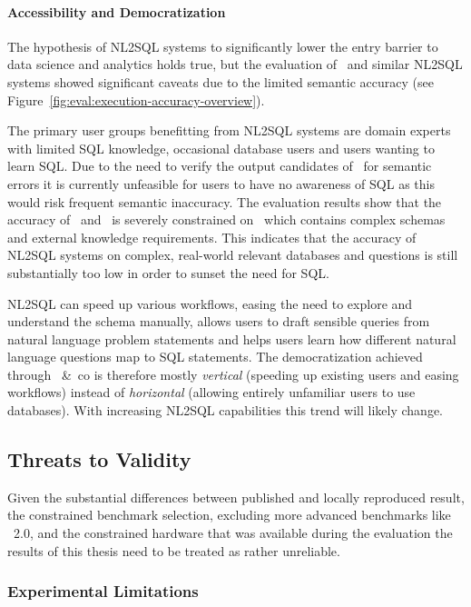 \paragraph{Accessibility and Democratization}

The hypothesis of NL2SQL systems to significantly lower the entry barrier to
data science and analytics holds true, but the evaluation of \Natural~and
similar NL2SQL systems showed significant caveats due to the limited semantic
accuracy (see Figure~\ref{fig:eval:execution-accuracy-overview}).

The primary user groups benefitting from NL2SQL systems are domain experts with
limited SQL knowledge, occasional database users and users wanting to learn
SQL. Due to the need to verify the output candidates of \Natural~for semantic
errors it is currently unfeasible for users to have no awareness of SQL as this
would risk frequent semantic inaccuracy. The evaluation results show that the
accuracy of \Natural~and \OmniSQL~is severely constrained on \Bird~which
contains complex schemas and external knowledge requirements. This indicates
that the accuracy of NL2SQL systems on complex, real-world relevant databases
and questions is still substantially too low in order to sunset the need for
SQL.

NL2SQL can speed up various workflows, easing the need to explore and
understand the schema manually, allows users to draft sensible queries from
natural language problem statements and helps users learn how different natural
language questions map to SQL statements. The democratization achieved through
\Natural~\&~co is therefore mostly \textit{vertical} (speeding up existing
users and easing workflows) instead of \textit{horizontal} (allowing entirely
unfamiliar users to use databases). With increasing NL2SQL capabilities this
trend will likely change.

\subsection{Threats to Validity}

Given the substantial differences between published and locally reproduced
result, the constrained benchmark selection, excluding more advanced benchmarks
like \Spider~2.0, and the constrained hardware that was available during the
evaluation the results of this thesis need to be treated as rather unreliable.

\subsubsection{Experimental Limitations}


